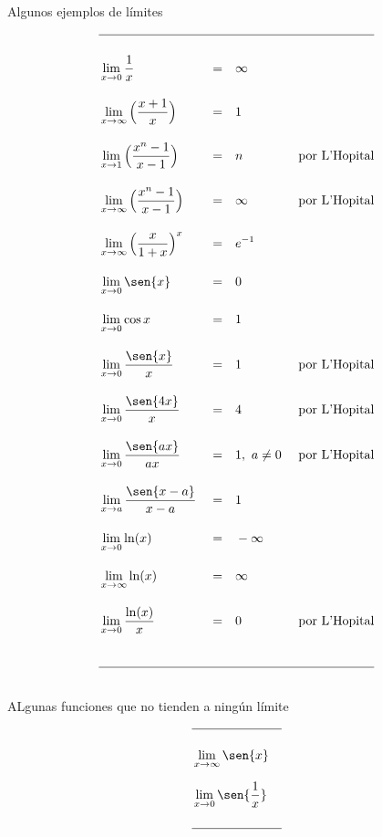 \documentclass[12pt,a4paper]{extarticle}
\newcommand{\limi}[4]{
  \lim_{#1 \to #2} #3 = #4
}
\begin{document}
\begin{table}[!htbp]
\caption{Algunos ejemplos de l\'imites}
{\renewcommand{\arraystretch}{1.5}
\begin{align*}
\hline \\
& \lim_{x \to 0}\frac{1}{x} && =     && \infty  &\\[1em]
& \lim_{x \to \infty}\Big(\frac{x+1}{x}\Big)&&=  && 1 &\\[1em]
&\lim_{x \to 1}\Big(\frac{x^n-1}{x-1}\Big)
                            && =  && n & \text{por L'Hopital}\\[1em]
&\lim_{x \to \infty}\Big(\frac{x^n-1}{x-1}\Big)&& =  && \infty
                                                &\text{por L'Hopital}\\[1em]
&\lim_{x \to \infty}\Big(\frac{x}{1+x}\Big)^x&& =   && e^{-1} &\\[1em]
&\lim_{x \to 0} \sen{x} &&= && 0 &\\[1em]
&\lim_{x \to 0} \cos{x} &&= && 1 &\\[1em]
& \lim_{x \to 0}\frac{\sen{x}}{x}
                            && = && 1 & \text{por L'Hopital}\\[1em]
& \lim_{x \to 0}\frac{\sen{4x}}{x} && = && 4 & \text{por L'Hopital}\\[1em]
& \lim_{x \to 0}\frac{\sen{ax}}{ax} && = && 1 , \ a \neq 0 & \
                                                             \text{por
                                                             L'Hopital} \\[1em]
& \lim_{x \to a}\frac{\sen{x-a}}{x-a} && = && 1  &\\[1em]
& \limi{x}{0}{\ln(x) &&}{ && - \infty} &\\[1em]
& \limi{x}{\infty}{\ln(x) &&}{ && \infty} &\\[1em]
& \limi{x}{0}{\frac{\ln(x)}{x} &&}{ && 0} &\ \text{por L'Hopital}\\[1em]
\vspace{1cm}\\
\hline \\
\end{align*}
}
\label{tab:limReg}
\end{table}

\begin{table}[!htbp]
\caption{ALgunas funciones que no tienden a ning\'un l\'imite}
{\renewcommand{\arraystretch}{1.5}
\begin{align*}
\hline \\
&\lim_{x \to \infty}\sen{x} &\\[0.7em]
&\lim_{x \to 0}\sen{\frac{1}{x}} &\\
\vspace{1cm}\\
\hline \\
\end{align*}
}
\label{tab:nolim}
\end{table}
\end{document}
